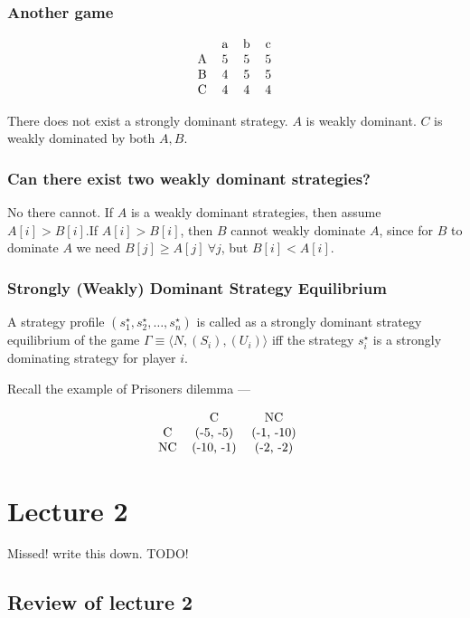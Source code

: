 \documentclass[11pt]{book}
\begin{document}
\subsection{Another game}
$$
\begin{tabular}{ccccc}
      & a & b & c \\
    A & 5 & 5 & 5 \\
    B & 4 & 5 & 5\\
    C & 4 & 4 & 4
\end{tabular}
$$

There does not exist a strongly dominant strategy.
$A$ is weakly dominant. $C$ is weakly dominated by both $A, B$.

\subsection{Can there exist two weakly dominant strategies?}
No there cannot. If $A$ is a weakly dominant strategies, then
assume $A[i] > B[i]$.If $A[i] > B[i]$, then $B$ cannot weakly dominate 
$A$, since for $B$ to dominate $A$ we need $B[j] \geq A[j]~ \forall j$,
but $B[i] < A[i]$.


\subsection{Strongly (Weakly) Dominant Strategy Equilibrium}
A strategy profile $(s_1^\star, s_2^\star, \dots, s_n^\star)$ is called as a strongly
dominant strategy equilibrium of the game $\Gamma \equiv \langle N, (S_i), (U_i) \rangle$ iff
the strategy $s_i^\star$ is a strongly dominating strategy for player $i$.

Recall the example of Prisoners dilemma ---

$$
\begin{tabular}{ccccc}
     & C & NC & \\
    C & (-5, -5) & (-1, -10) \\ 
    NC &  (-10, -1) & (-2, -2)
\end{tabular}
$$

\chapter{Lecture 2}
Missed! write this down. TODO!

\section{Review of lecture 2}
\end{document}
